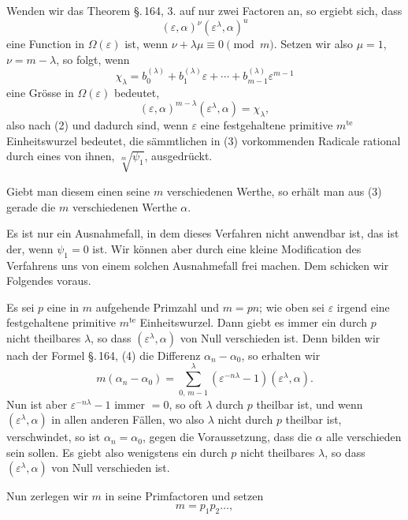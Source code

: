 
Wenden wir das Theorem \S.\,164, 3. auf nur zwei Factoren an, so ergiebt sich, dass
\[
(\varepsilon,\alpha)^{\nu}(\varepsilon^{\lambda},\alpha)^{u}
\]
eine Function in $\Omega(\varepsilon)$ ist, wenn $\nu + \lambda\mu \equiv 0 \pmod{m}$. Setzen wir also $\mu = 1$, $\nu = m - \lambda$, so folgt, wenn
\[
\chi_\lambda = b_0^{(\lambda)} + b_1^{(\lambda)}\varepsilon + \cdots + b_{m-1}^{(\lambda)}\varepsilon^{m-1}
\]
eine Grösse in $\Omega(\varepsilon)$ bedeutet,
\[
(\varepsilon,\alpha)^{m-\lambda}(\varepsilon^{\lambda},\alpha) = \chi_\lambda,
\]
also nach (2)
und dadurch sind, wenn $\varepsilon$ eine festgehaltene primitive $m^{\mathrm{te}}$ Einheitswurzel bedeutet, die sämmtlichen in (3) vorkommenden Radicale rational durch eines von ihnen, $\sqrt[m]{\psi_1}$, ausgedrückt.

Giebt man diesem einen seine $m$ verschiedenen Werthe, so erhält man aus (3) gerade die $m$ verschiedenen Werthe $\alpha$.

Es ist nur ein Ausnahmefall, in dem dieses Verfahren nicht anwendbar ist, das ist der, wenn $\psi_1 = 0$ ist. Wir können aber durch eine kleine Modification des Verfahrens uns von einem solchen Ausnahmefall frei machen. Dem schicken wir Folgendes voraus.

Es sei $p$ eine in $m$ aufgehende Primzahl und $m = pn$; wie oben sei $\varepsilon$ irgend eine festgehaltene primitive $m^{\mathrm{te}}$ Einheitswurzel. Dann giebt es immer ein durch $p$ nicht theilbares $\lambda$, so dass $(\varepsilon^{\lambda},\alpha)$ von Null verschieden ist. Denn bilden wir nach der Formel \S.\,164, (4) die Differenz $\alpha_n - \alpha_0$, so erhalten wir
\[
m(\alpha_n - \alpha_0) = \sum_{0,\,m-1}^{\lambda}(\varepsilon^{-n\lambda} - 1)(\varepsilon^{\lambda},\alpha).
\]
Nun ist aber $\varepsilon^{-n\lambda} - 1$ immer $= 0$, so oft $\lambda$ durch $p$ theilbar ist, und wenn $(\varepsilon^{\lambda},\alpha)$ in allen anderen Fällen, wo also $\lambda$ nicht durch $p$ theilbar ist, verschwindet, so ist $\alpha_n = \alpha_0$, gegen die Voraussetzung, dass die $\alpha$ alle verschieden sein sollen. Es giebt also wenigstens ein durch $p$ nicht theilbares $\lambda$, so dass $(\varepsilon^{\lambda},\alpha)$ von Null verschieden ist.

Nun zerlegen wir $m$ in seine Primfactoren und setzen
\[
m = p_1 p_2 \dots,
\]
